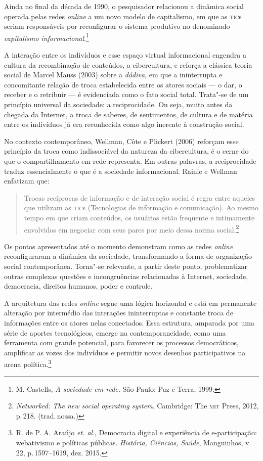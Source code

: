 Ainda no final da década de 1990, o pesquisador relacionou a dinâmica
social operada pelas redes \textit{online} a um novo modelo de capitalismo, em
que as \textsc{tic}s seriam responsáveis por reconfigurar o sistema produtivo no
denominado \textit{capitalismo informacional}.\footnote{M. Castells, \textit{A sociedade em rede.} São Paulo: Paz e Terra, 1999.}

A interação entre os indivíduos e esse espaço virtual informacional
engendra a cultura da recombinação de conteúdos, a cibercultura, e
reforça a clássica teoria social de Marcel Mauss (2003) sobre a
\textit{dádiva}, em que a ininterrupta e concomitante relação de troca
estabelecida entre os atores sociais --- o dar, o receber e o retribuir
--- é evidenciada como o fato social total. Trata"-se de um princípio
universal da sociedade: a reciprocidade. Ou seja, muito antes da chegada
da Internet, a troca de saberes, de sentimentos, de cultura e de matéria
entre os indivíduos já era reconhecida como algo inerente à construção
social.

No contexto contemporâneo, Wellman, Côte e Plickert (2006) reforçam esse
princípio da troca como indissociável da natureza da cibercultura, é o
cerne do que o compartilhamento em rede representa. Em outras palavras,
a reciprocidade traduz essencialmente o que é a sociedade informacional.
Rainie e Wellman enfatizam que:

\begin{quote}
Trocas recíprocas de informação e de interação social é regra entre
aqueles que utilizam as \textsc{tic}s (Tecnologias de informação e comunicação).
Ao mesmo tempo em que criam conteúdos, os usuários estão frequente e
intimamente envolvidos em negociar com seus pares por meio dessa norma
social.\footnote{\textit{Networked: The new social
operating system}. Cambridge: The \textsc{mit} Press, 2012, p.\,218. (trad.\,nossa.)}
\end{quote}

Os pontos apresentados até o momento demonstram como as redes \textit{online}
reconfiguraram a dinâmica da sociedade, transformando a forma de
organização social contemporânea. Torna"-se relevante, a partir deste
ponto, problematizar outras complexas questões e incongruências
relacionadas à Internet, sociedade, democracia, direitos humanos, poder
e controle.

A arquitetura das redes \textit{online} segue uma lógica horizontal e está em
permanente alteração por intermédio das interações ininterruptas e
constante troca de informações entre os atores nelas conectados. Essa
estrutura, amparada por uma série de aportes tecnológicos, emerge na
contemporaneidade, como uma ferramenta com grande potencial, para
favorecer os processos democráticos, amplificar as vozes dos indivíduos
e permitir novos desenhos participativos na arena política.\footnote{R. de P. A. Araújo \textit{et. al}., Democracia digital e experiência de
e-participação: webativismo e políticas públicas. \textit{História, Ciências,
Saúde}, Manguinhos, v.\,22, p.\,1597--1619, dez. 2015.}

